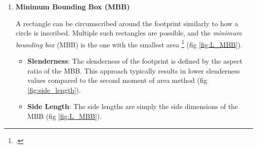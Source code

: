 \begin{refsection}
\begin{enumerate}
\begin{itemize}
        For a rectangular footprint, this yields:
        \[
        \sqrt{\frac{\frac{1}{12}ba^3}{\frac{1}{12}ab^3}} = \sqrt{\frac{a^2}{b^2}} = \frac{a}{b}
        \]

        \item \textbf{Side Length}: The side length in the direction perpendicular to the axis of the largest principal moment ($I_1$) is computed as:

        \begin{equation}
            \label{eq:side_I}
            \text{Side Length} = \sqrt{\text{Area} \times \text{Slenderness}}
        \end{equation}

        The side length in the direction perpendicular to the smallest moment ($I_2$) is then computed by dividing the area by the length calculated above.

        For example, with a rectangle of area $A = ab$ and slenderness $\frac{a}{b}$, we get:
        \[
        \sqrt{ab \cdot \frac{a}{b}} = \sqrt{a^2} = a
        \]

        This method yields an average side length in each principal direction (fig \ref{fig:L_SMA}).

    \end{itemize}

    \item \textbf{Minimum Bounding Box (MBB)}

    A rectangle can be circumscribed around the footprint similarly to how a circle is inscribed. Multiple such rectangles are possible, and the \emph{minimum bounding box} (MBB) is the one with the smallest area \footcite{chaudhuri_simple_2007} (fig \ref{fig:L_MBB}).

    \begin{itemize}
        \item \textbf{Slenderness}: The slenderness of the footprint is defined by the aspect ratio of the MBB. This approach typically results in lower slenderness values compared to the second moment of area method (fig \ref{fig:side_length}).

        \item \textbf{Side Length}: The side lengths are simply the side dimensions of the MBB (fig \ref{fig:L_MBB}).
    \end{itemize}
\end{enumerate}


\end{refsection}
